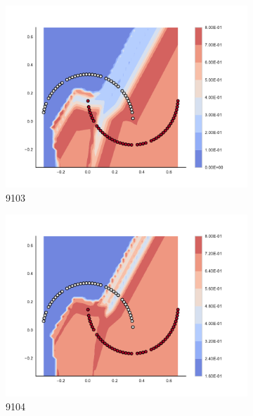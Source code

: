 \begin{figure}[h]
\begin{subfigure}[b]{0.09\textwidth}
    \includegraphics[clip, trim=2.35cm 1.75cm 4.5cm 0cm,width=\textwidth]{img/convergence/9103.pdf}
    \caption{9103}
    \label{fig:convergence_9103}
\end{subfigure}
%
\begin{subfigure}[b]{0.09\textwidth}
    \includegraphics[clip, trim=2.35cm 1.75cm 4.5cm 0cm,width=\textwidth]{img/convergence/9104.pdf}
    \caption{9104}
    \label{fig:convergence_9104}
\end{subfigure}
%
\begin{subfigure}[b]{0.09\textwidth}

\end{subfigure}
\end{figure}
